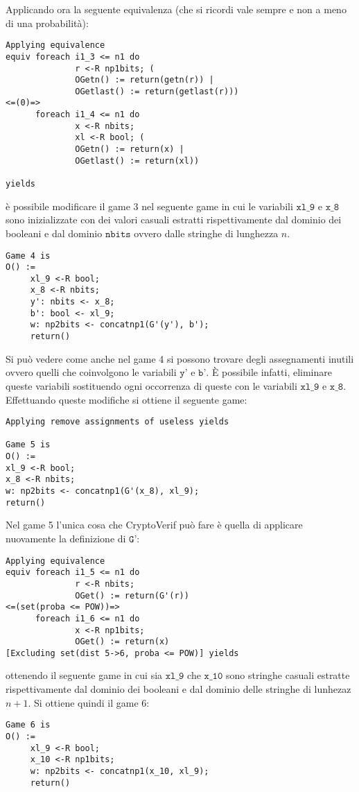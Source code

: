 \documentclass[a4paper,openright,twoside,12pt]{report}
\begin{document}
Applicando ora la seguente equivalenza (che si ricordi vale sempre e non a meno di una probabilit\`a):
\begin{verbatim} 
Applying equivalence
equiv foreach i1_3 <= n1 do 
              r <-R np1bits; (
              OGetn() := return(getn(r)) |
              OGetlast() := return(getlast(r)))
<=(0)=>
      foreach i1_4 <= n1 do 
              x <-R nbits; 
              xl <-R bool; (
              OGetn() := return(x) |
              OGetlast() := return(xl))

yields
\end{verbatim}
\`e possibile modificare il game 3 nel seguente game in cui le variabili $\texttt{xl\_9}$ e $\texttt{x\_8}$ sono inizializzate con dei valori casuali estratti rispettivamente dal dominio dei booleani e dal dominio
$\texttt{nbits}$ ovvero dalle stringhe di lunghezza $n$.
\begin{verbatim} 
Game 4 is
O() :=
     xl_9 <-R bool;
     x_8 <-R nbits;
     y': nbits <- x_8;
     b': bool <- xl_9;
     w: np2bits <- concatnp1(G'(y'), b');
     return()
\end{verbatim}
Si pu\`o vedere come anche nel game 4 si possono trovare degli assegnamenti inutili ovvero quelli che coinvolgono le variabili $\texttt{y'}$ e $\texttt{b'}$. \`E possibile infatti, eliminare queste variabili
sostituendo ogni occorrenza di queste con le variabili $\texttt{xl\_9}$ e $\texttt{x\_8}$. Effettuando queste modifiche si ottiene il seguente game:
\begin{verbatim} 
Applying remove assignments of useless yields

Game 5 is
O() :=
xl_9 <-R bool;
x_8 <-R nbits;
w: np2bits <- concatnp1(G'(x_8), xl_9);
return()
\end{verbatim}
Nel game 5 l'unica cosa che CryptoVerif pu\`o fare \`e quella di applicare nuovamente la definizione di $\texttt{G'}$:
\begin{verbatim}
Applying equivalence
equiv foreach i1_5 <= n1 do 
              r <-R nbits; 
              OGet() := return(G'(r))
<=(set(proba <= POW))=>
      foreach i1_6 <= n1 do 
              x <-R np1bits; 
              OGet() := return(x)
[Excluding set(dist 5->6, proba <= POW)] yields
\end{verbatim}
ottenendo il seguente game in cui sia $\texttt{xl\_9}$ che $\texttt{x\_10}$ sono stringhe casuali estratte rispettivamente dal dominio dei booleani e dal dominio delle stringhe di lunhezaz $n+1$. Si ottiene quindi il game 6:
\begin{verbatim}
Game 6 is
O() :=
     xl_9 <-R bool;
     x_10 <-R np1bits;
     w: np2bits <- concatnp1(x_10, xl_9);
     return()
\end{verbatim}
\end{document}
